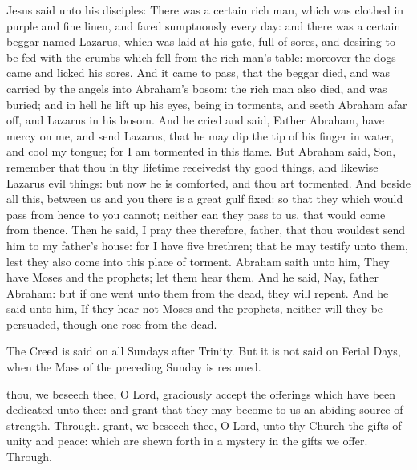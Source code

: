 
 Jesus said unto his disciples: There was a certain rich man, which was clothed in purple and fine linen, and fared sumptuously every day: and there was a certain beggar named Lazarus, which was laid at his gate, full of sores, and desiring to be fed with the crumbs which fell from the rich man's table: moreover the dogs came and licked his sores. And it came to pass, that the beggar died, and was carried by the angels into Abraham's bosom: the rich man also died, and was buried; and in hell he lift up his eyes, being in torments, and seeth Abraham afar off, and Lazarus in his bosom. And he cried and said, Father Abraham, have mercy on me, and send Lazarus, that he may dip the tip of his finger in water, and cool my tongue; for I am tormented in this flame. But Abraham said, Son, remember that thou in thy lifetime receivedst thy good things, and likewise Lazarus evil things: but now he is comforted, and thou art tormented. And beside all this, between us and you there is a great gulf fixed: so that they which would pass from hence to you cannot; neither can they pass to us, that would come from thence. Then he said, I pray thee therefore, father, that thou wouldest send him to my father's house: for I have five brethren; that he may testify unto them, lest they also come into this place of torment. Abraham saith unto him, They have Moses and the prophets; let them hear them. And he said, Nay, father Abraham: but if one went unto them from the dead, they will repent. And he said unto him, If they hear not Moses and the prophets, neither will they be persuaded, though one rose from the dead.
\begin{rubric}
    The Creed is said on all Sundays after Trinity. But it is not said on Ferial Days, when the Mass of the preceding Sunday is resumed.
\end{rubric}
\secret
{} thou, we beseech thee, O Lord, graciously accept the offerings which have been dedicated unto thee: and grant that they may become to us an abiding source of strength. Through.
 grant, we beseech thee, O Lord, unto thy Church the gifts of unity and peace: which are shewn forth in a mystery in the gifts we offer. Through.

